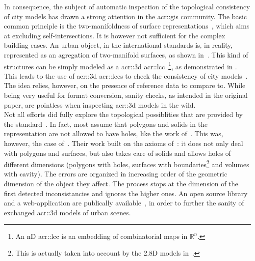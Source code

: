         In consequence, the subject of automatic inspection of the topological consistency of city models has drawn a strong attention in the \gls{acr::gis} community.
        The basic common principle is the two-manifoldness of surface representations~\parencite{groger2011achieve}, which aims at excluding self-intersections.
        It is however not sufficient for the complex building cases.
        An urban object, in the international standards is, in reality, represented as an agregation of two-manifold surfaces, as shown in~\textcite{groger2011achieve, ledoux2013validation}.
        This kind of structures can be simply modeled as a \gls{acr::3d} \gls{acr::lcc}~\parencite{damiand2014combinatorial}\footnote{
            An nD \gls{acr::lcc} is an embedding of combinatorial maps in \(\mathbb{R}^n\).
        }, as demonstrated in \textcite{diakite2014topological}.
        This leads to the use of \gls{acr::3d} \glspl{acr::lcc} to check the consistency of city models~\parencite{gorszczyk2016automatic}.
        The idea relies, however, on the presence of reference data to compare to.
        While being very useful for format conversion, sanity checks, as intended in the original paper, are pointless when inspecting \gls{acr::3d} models in the wild.\\
        Not all efforts did fully explore the topological possiblities that are provided by the standard~\parencite{ledoux2013validation,biljecki2016most}.
        In fact, most assume that polygons and solids in the representation are not allowed to have holes, like the work of~\textcite{groger2011achieve, alam2014towards}.
        This was, however, the case of~\textcite{ledoux2013validation}.
        Their work built on the axioms of~\textcite{groger2011achieve}: it does not only deal with polygons and surfaces, but also takes care of solids and allows holes of different dimensions (polygons with holes, surfaces with boundaries\footnote{
            This is actually taken into account by the 2.8D models in~\textcite{groger2011achieve}.
        } and volumes with cavity).
        The errors are organized in increasing order of the geometric dimension of the object they affect.
        The process stops at the dimension of the first detected inconsistancies and ignores the higher ones. 
        An open source library and a web-application are publically available~\parencite{ledoux2018val3dity}, in order to further the sanity of exchanged \gls{acr::3d} models of urban scenes.\\

